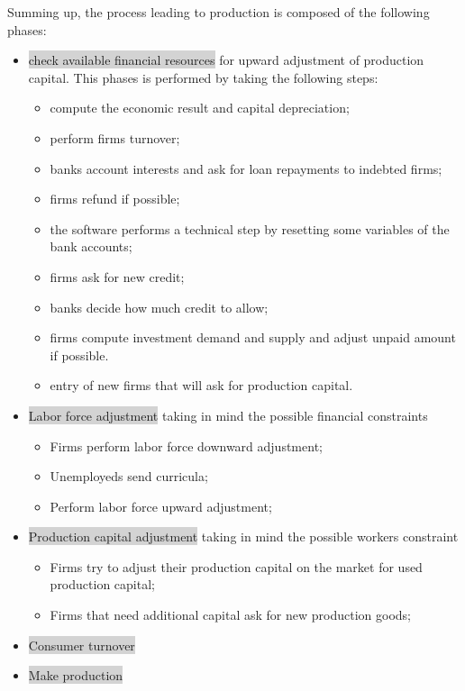 \documentclass{book}
\begin{document}
Summing up, the process leading to production is composed of the following phases:
\begin{itemize}
	\item \colorbox{lightgray}{check available financial resources} for upward adjustment of production capital. This phases is performed by taking the following steps:

\begin{itemize}
	\item compute the economic result and capital depreciation;
	\item perform firms turnover;
	\item banks account interests and ask for loan repayments to indebted firms;
	\item firms refund if possible;
	\item the software performs a technical step by resetting some variables of the bank accounts;
	\item firms ask for new credit;
	\item banks decide how much credit to allow;
	\item firms compute investment demand and supply and adjust unpaid amount if possible.
	\item entry of new firms that will ask for production capital.
\end{itemize}


	\item \colorbox{lightgray}{Labor force adjustment} taking in mind the possible financial constraints
		\begin{itemize}
			\item Firms perform labor force downward adjustment;
			\item Unemployeds send curricula;
			\item Perform labor force upward adjustment; 
		\end{itemize}
	\item \colorbox{lightgray}{Production capital adjustment} taking in mind the possible workers constraint
		\begin{itemize}
			\item Firms try to adjust their production capital on the market for used production capital;
			\item Firms that need additional capital ask for new production goods;
		\end{itemize}
	\item \colorbox{lightgray}{Consumer turnover}
	\item \colorbox{lightgray}{Make production}
\end{itemize}
\end{document}
